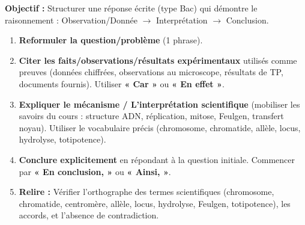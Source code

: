 \documentclass[11pt]{article}
\begin{document}
\begin{methode}
\textbf{Objectif :} Structurer une réponse écrite (type Bac) qui démontre le raisonnement : Observation/Donnée $\rightarrow$ Interprétation $\rightarrow$ Conclusion.
\begin{enumerate}
    \item \textbf{Reformuler la question/problème} (1 phrase).
    \item \textbf{Citer les faits/observations/résultats expérimentaux} utilisés comme preuves (données chiffrées, observations au microscope, résultats de TP, documents fournis). Utiliser \textbf{« Car »} ou \textbf{« En effet »}.
    \item \textbf{Expliquer le mécanisme / L'interprétation scientifique} (mobiliser les savoirs du cours : structure ADN, réplication, mitose, Feulgen, transfert noyau). Utiliser le vocabulaire précis (chromosome, chromatide, allèle, locus, hydrolyse, totipotence).
    \item \textbf{Conclure explicitement} en répondant à la question initiale. Commencer par \textbf{« En conclusion, »} ou \textbf{« Ainsi, »}.
    \item \textbf{Relire :} Vérifier l'orthographe des termes scientifiques (chromosome, chromatide, centromère, allèle, locus, hydrolyse, Feulgen, totipotence), les accords, et l'absence de contradiction.
\end{enumerate}
\end{methode}
\end{document}
